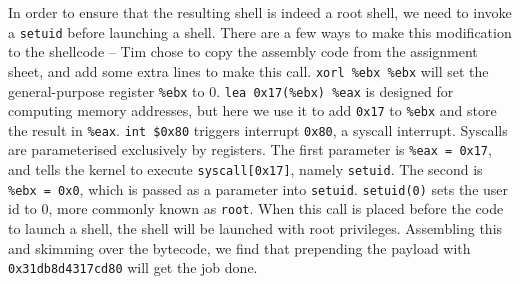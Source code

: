 In order to ensure that the resulting shell is indeed a root shell, we need to invoke a {\tt setuid} before launching a
shell. There are a few ways to make this modification to the shellcode -- Tim chose to copy the assembly code from the
assignment sheet, and add some extra lines to make this call. {\tt xorl \%ebx \%ebx} will set the general-purpose
register {\tt \%ebx} to 0. {\tt lea 0x17(\%ebx) \%eax} is designed for computing memory addresses, but here we use it to
add {\tt 0x17} to {\tt \%ebx} and store the result in {\tt \%eax}. {\tt int \$0x80} triggers interrupt {\tt 0x80}, a
syscall interrupt. Syscalls are parameterised exclusively by registers.%
The first parameter is {\tt \%eax = 0x17}, and tells the kernel to execute {\tt syscall[0x17]}, namely {\tt setuid}. The
second is {\tt \%ebx = 0x0}, which is passed as a parameter into {\tt setuid}. {\tt setuid(0)} sets the user id to 0,
more commonly known as {\tt root}. When this call is placed before the code to launch a shell, the shell will be
launched with root privileges. Assembling this and skimming over the bytecode, we find that prepending the payload with
{\tt 0x31db8d4317cd80} will get the job done.
